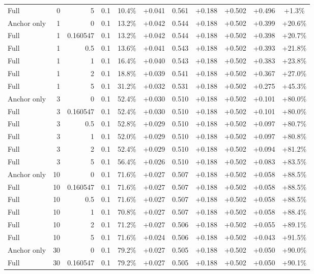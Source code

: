 \begin{table}[htbp]
\begin{tabular}{lrrrccccccc}
Full & 0 & 5 & 0.1 & 10.4\% & +0.041 & 0.561 & +0.188 & +0.502 & +0.496 & +1.3\% \\
Anchor only & 1 & 0 & 0.1 & 13.2\% & +0.042 & 0.544 & +0.188 & +0.502 & +0.399 & +20.6\% \\
Full & 1 & 0.160547 & 0.1 & 13.2\% & +0.042 & 0.544 & +0.188 & +0.502 & +0.398 & +20.7\% \\
Full & 1 & 0.5 & 0.1 & 13.6\% & +0.041 & 0.543 & +0.188 & +0.502 & +0.393 & +21.8\% \\
Full & 1 & 1 & 0.1 & 16.4\% & +0.040 & 0.543 & +0.188 & +0.502 & +0.383 & +23.8\% \\
Full & 1 & 2 & 0.1 & 18.8\% & +0.039 & 0.541 & +0.188 & +0.502 & +0.367 & +27.0\% \\
Full & 1 & 5 & 0.1 & 31.2\% & +0.032 & 0.531 & +0.188 & +0.502 & +0.275 & +45.3\% \\
Anchor only & 3 & 0 & 0.1 & 52.4\% & +0.030 & 0.510 & +0.188 & +0.502 & +0.101 & +80.0\% \\
Full & 3 & 0.160547 & 0.1 & 52.4\% & +0.030 & 0.510 & +0.188 & +0.502 & +0.101 & +80.0\% \\
Full & 3 & 0.5 & 0.1 & 52.8\% & +0.029 & 0.510 & +0.188 & +0.502 & +0.097 & +80.7\% \\
Full & 3 & 1 & 0.1 & 52.0\% & +0.029 & 0.510 & +0.188 & +0.502 & +0.097 & +80.8\% \\
Full & 3 & 2 & 0.1 & 52.4\% & +0.029 & 0.510 & +0.188 & +0.502 & +0.094 & +81.2\% \\
Full & 3 & 5 & 0.1 & 56.4\% & +0.026 & 0.510 & +0.188 & +0.502 & +0.083 & +83.5\% \\
Anchor only & 10 & 0 & 0.1 & 71.6\% & +0.027 & 0.507 & +0.188 & +0.502 & +0.058 & +88.5\% \\
Full & 10 & 0.160547 & 0.1 & 71.6\% & +0.027 & 0.507 & +0.188 & +0.502 & +0.058 & +88.5\% \\
Full & 10 & 0.5 & 0.1 & 71.6\% & +0.027 & 0.507 & +0.188 & +0.502 & +0.058 & +88.5\% \\
Full & 10 & 1 & 0.1 & 70.8\% & +0.027 & 0.507 & +0.188 & +0.502 & +0.058 & +88.4\% \\
Full & 10 & 2 & 0.1 & 71.2\% & +0.027 & 0.506 & +0.188 & +0.502 & +0.055 & +89.1\% \\
Full & 10 & 5 & 0.1 & 71.6\% & +0.024 & 0.506 & +0.188 & +0.502 & +0.043 & +91.5\% \\
Anchor only & 30 & 0 & 0.1 & 79.2\% & +0.027 & 0.505 & +0.188 & +0.502 & +0.050 & +90.0\% \\
Full & 30 & 0.160547 & 0.1 & 79.2\% & +0.027 & 0.505 & +0.188 & +0.502 & +0.050 & +90.1\% \\

\end{tabular}
\end{table}
